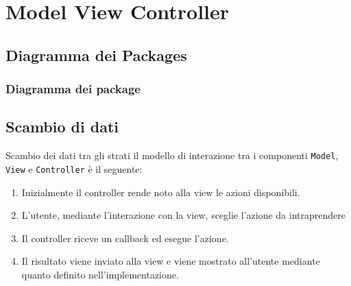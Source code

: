 \section{Model View Controller}

\subsection{Diagramma dei Packages}
\begin{frame}
    \frametitle{Diagramma dei package}
    \begin{figure}
        \centering
    \end{figure}
\end{frame}

\subsection{Scambio di dati}
\begin{frame}{Scambio dei dati tra gli strati}
    il modello di interazione tra i componenti \texttt{Model}, \texttt{View} e \texttt{Controller} è il seguente:

    \begin{minipage}{.49\textwidth}
        \begin{figure}
            \centering
        \end{figure}
    \end{minipage}
    \begin{minipage}{.49\textwidth}
        \begin{enumerate}
            \item<1-> Inizialmente il controller rende noto alla view le azioni disponibili.
            \item<2-> L'utente, mediante l'interazione con la view, sceglie l'azione da intraprendere
            \item<3-> Il controller riceve un callback ed esegue l'azione.
            \item <4-> Il risultato viene inviato alla view e viene mostrato all'utente mediante quanto definito nell'implementazione.
        \end{enumerate}
    \end{minipage}
\end{frame}

